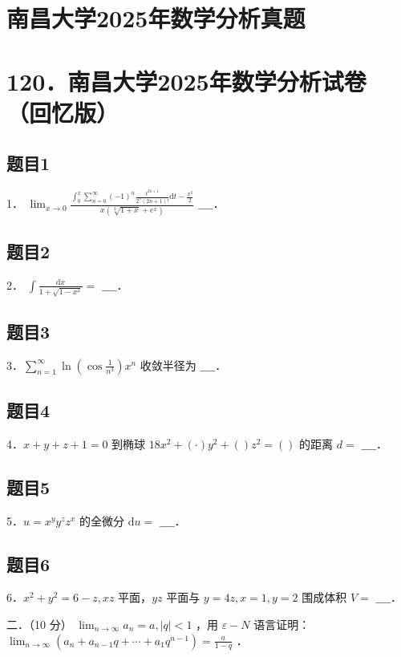 \documentclass{article}
\begin{document}
\section*{南昌大学2025年数学分析真题}
\section*{120．南昌大学2025年数学分析试卷（回忆版）}

\subsection{题目1}
1． \(\lim _{x \rightarrow 0} \frac{\int_{0}^{x} \sum_{n=0}^{\infty}(-1)^{n} \frac{t^{2 n+1}}{2^{n}(2 n+1)!} \mathrm{d} t-\frac{x^{2}}{2}}{x\left(\sqrt[3]{1+x}+e^{x}\right)}\) \(\_\_\_\_\)．

\subsection{题目2}
2． \(\int \frac{\mathrm{d} x}{1+\sqrt{1-x^{2}}}=\) \(\_\_\_\_\)．

\subsection{题目3}
3．\(\sum_{n=1}^{\infty} \ln \left(\cos \frac{1}{n^{3}}\right) x^{n}\) 收敛半径为 \(\_\_\_\_\)．

\subsection{题目4}
4．\(x+y+z+1=0\) 到椭球 \(18 x^{2}+(\cdot) y^{2}+() z^{2}=()\) 的距离 \(d=\) \(\_\_\_\_\)．

\subsection{题目5}
5．\(u=x^{y} y^{z} z^{x}\) 的全微分 \(\mathrm{d} u=\) \(\_\_\_\_\)．

\subsection{题目6}
6．\(x^{2}+y^{2}=6-z, x z\) 平面，\(y z\) 平面与 \(y=4 z, x=1, y=2\) 围成体积 \(V=\) \(\_\_\_\_\)．

二．（10 分） \(\lim _{n \rightarrow \infty} a_{n}=a,|q|<1\) ，用 \(\varepsilon-N\) 语言证明： \(\lim _{n \rightarrow \infty}\left(a_{n}+a_{n-1} q+\cdots+a_{1} q^{n-1}\right)=\frac{a}{1-q}\) ．
\end{document}
